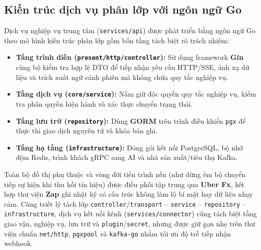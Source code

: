 \subsection{Kiến trúc dịch vụ phân lớp với ngôn ngữ Go}
Dịch vụ nghiệp vụ trung tâm (\texttt{services/\hspace{0pt}api}) được phát triển bằng ngôn ngữ Go theo mô hình kiến trúc phân lớp gồm bốn tầng tách biệt rõ trách nhiệm:
\begin{itemize}
  \item \textbf{Tầng trình diễn (\texttt{present/\hspace{0pt}http/\hspace{0pt}controller}):} Sử dụng framework \textbf{Gin} cùng bộ kiểm tra hợp lệ DTO để tiếp nhận yêu cầu HTTP/SSE, ánh xạ dữ liệu và trích xuất ngữ
    cảnh phiên mà không chứa quy tắc nghiệp vụ.
  \item \textbf{Tầng dịch vụ (\texttt{core/\hspace{0pt}service}):} Nắm giữ độc quyền quy tắc nghiệp vụ, kiểm tra phân quyền hiện hành và xác thực chuyển trạng thái.
  \item \textbf{Tầng lưu trữ (\texttt{repository}):} Dùng \textbf{GORM} trên trình điều khiển \texttt{pgx} để thực thi giao dịch nguyên tử và khóa bản ghi.
  \item \textbf{Tầng hạ tầng (\texttt{infrastructure}):} Đóng gói kết nối PostgreSQL, bộ nhớ đệm Redis, trình khách gRPC sang AI và nhà sản xuất/tiêu thụ Kafka.
\end{itemize}
Toàn bộ đồ thị phụ thuộc và vòng đời tiến trình nền (như dừng êm bộ chuyển tiếp sự kiện khi thu hồi tín hiệu) được điều phối tập trung qua \textbf{Uber Fx}, kết hợp thư viện \textbf{Zap} ghi nhật
ký có cấu trúc không làm lộ bí mật hay dữ liệu nhạy cảm. Cùng triết lý tách lớp \texttt{controller}/\hspace{0pt}\texttt{transport} -- \texttt{service} -- \texttt{repository} -- \texttt{infrastructure}, dịch
vụ kết nối kênh (\texttt{services/\hspace{0pt}connector}) cũng tách biệt tầng giao vận, nghiệp vụ, lưu trữ và \texttt{plugin}/\hspace{0pt}\texttt{secret}, nhưng được giữ gọn nhẹ trên thư viện chuẩn \texttt{net/\hspace{0pt}http},
\texttt{pgxpool} và \texttt{kafka-\hspace{0pt}go} nhằm tối ưu độ trễ tiếp nhận webhook.

